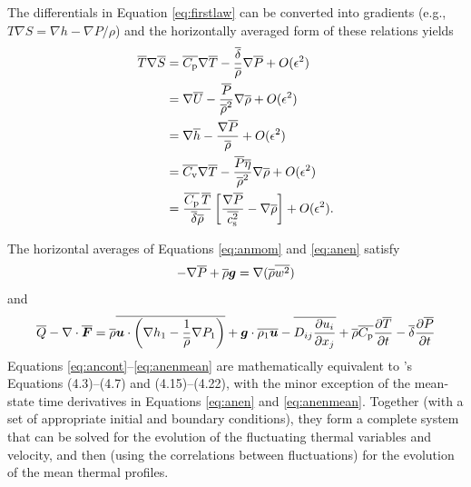 \documentclass[12pt]{article}
\newcommand{\vecf}{\bm{F}}
\begin{document}
   The differentials in Equation \eqref{eq:firstlaw} can be converted into gradients (e.g., $T\nabla S= \nabla h - \nabla P/\rho$) and the horizontally averaged form of these relations yields 
  \begin{subequations}\label{eq:anfirstlawmean}
  	\begin{align}
  		\overline{T}\nabla\overline{S} &= \overline{C_{\rm{p}}}\nabla\overline{T} - \frac{\overline{\delta}}{\overline{\rho}}\nabla\overline{P} + O(\epsilon^2)\label{eq:anfirstlawmeantmpprs}\\
	 		&= \nabla\overline{U} - \frac{\overline{P}}{\overline{\rho}^2}\nabla\overline{\rho} + O(\epsilon^2) \label{eq:anfirstlawmeaninterho}\\
	 &= \nabla \overline{h} - \frac{\nabla\overline{P}}{\overline{\rho}} + O(\epsilon^2)\label{eq:anfirstlawmeanenthprs}\\
	 &= \overline{C_{\rm{v}}} \nabla\overline{T} - \frac{\overline{P}\overline{\eta}}{\overline{\rho}^2}\nabla\overline{\rho} + O(\epsilon^2)\label{eq:anfirstlawmeantmprho}\\		
  		&= \frac{\overline{C_{\rm{p}}}\,\overline{T}}{\overline{\delta}\overline{\rho}}\left[\frac{\nabla\overline{P}}{\overline{c_{\rm s}^2}}-\nabla\overline{\rho}\right]+O(\epsilon^2).\label{eq:anfirstlawmeanprsrho}
  	\end{align}
  \end{subequations}
  
   The horizontal averages of Equations \eqref{eq:anmom} and \eqref{eq:anen} satisfy 
  \begin{align}\label{eq:anmommean}
  	-\nabla\overline{P} + \overline{\rho}\bm{g} = \nabla(\overline{\rho} \overline{w^2})
  \end{align}
  and
  \begin{align}\label{eq:anenmean}
  	\heatover - \Div\overline{\vecf} = \rhoover\overline{\vecu\cdot\left(\nabla \enthone-\frac{1}{\rhoover}\nabla \prsone\right)} + \vecg\cdot\overline{\rhoone\vecu} - \overline{D_{ij}\pderiv{u_i}{x_j}} +	\rhoover\cpover\pderiv{\tmpover}{t}- \deltaover \pderiv{\prsover}{t}
  \end{align}
   Equations \eqref{eq:ancont}--\eqref{eq:anenmean} are mathematically equivalent to \citet{Gough1969}'s Equations (4.3)--(4.7) and (4.15)--(4.22), with the minor exception of the mean-state time derivatives in Equations \eqref{eq:anen} and \eqref{eq:anenmean}. Together (with a set of appropriate initial and boundary conditions), they form a complete system that can be solved for the evolution of the fluctuating thermal variables and velocity, and then (using the correlations between fluctuations) for the evolution of the mean thermal profiles. %
\end{document}
